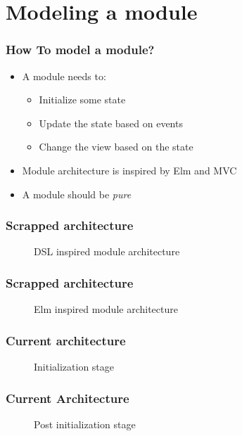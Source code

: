 \section{Modeling a module}
\SectionPage

\begin{frame}
  \frametitle{How To model a module?}
  \begin{itemize}
    \item A module needs to:
      \pause
      \begin{itemize}
        \item Initialize some state
        \pause
        \item Update the state based on events
        \pause
        \item Change the view based on the state
      \end{itemize}
      \pause
    \item Module architecture is inspired by Elm and MVC
      \pause
    \item A module should be \textit{pure}
  \end{itemize}
\end{frame}

\hidelogo

\begin{frame}
  \frametitle{Scrapped architecture}
  \begin{figure}
    \centering
    
    \caption{DSL inspired module architecture}
  \end{figure}
\end{frame}

\begin{frame}
  \frametitle{Scrapped architecture}
  \begin{figure}
    \centering
    
    \caption{Elm inspired module architecture}
  \end{figure}
\end{frame}

\begin{frame}
  \frametitle{Current architecture}
  \begin{figure}
    \centering
    
    \caption{Initialization stage}
  \end{figure}
\end{frame}


\begin{frame}
  \frametitle{Current Architecture}
  \begin{figure}
    \centering
    
    \caption{Post initialization stage}
  \end{figure}
\end{frame}

